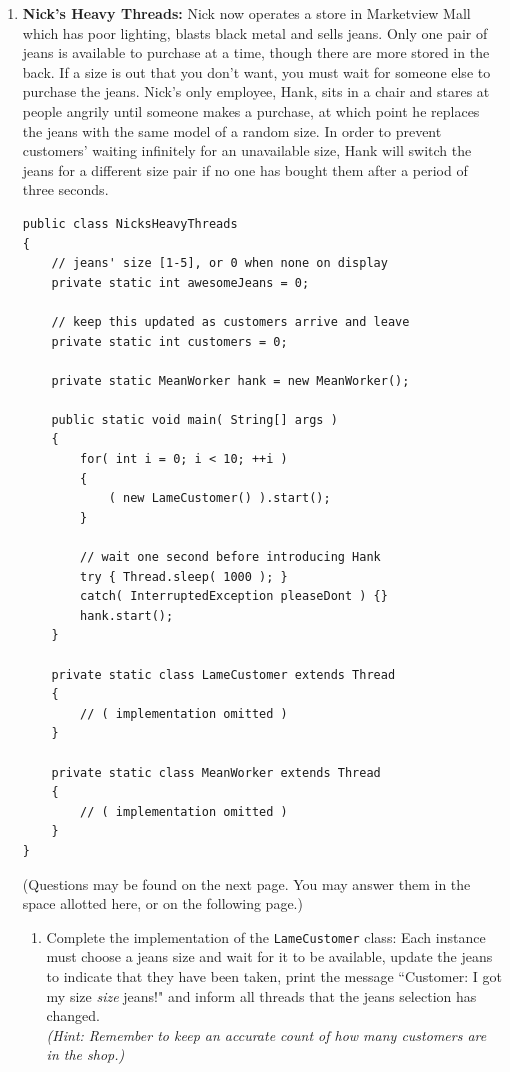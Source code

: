 \documentclass[11pt]{article}
\begin{document}
\begin{enumerate}

\item {\bf Nick's Heavy Threads:} Nick now operates a store in Marketview Mall which
      has poor lighting, blasts black metal and sells jeans. Only one pair of
      jeans is available to purchase at a time, though there are more
      stored in the back. If a size is out that you don't want, you must wait
      for someone else to purchase the jeans. Nick's only employee, Hank, sits
      in a chair and stares at people angrily until someone makes a purchase,
      at which point he replaces the jeans with the same model of a random
      size. In order to prevent customers' waiting infinitely for an
      unavailable size, Hank will switch the jeans for a different size pair if
      no one has bought them after a period of three seconds.

\begin{lstlisting}
public class NicksHeavyThreads
{
	// jeans' size [1-5], or 0 when none on display
    private static int awesomeJeans = 0;
    
	// keep this updated as customers arrive and leave
    private static int customers = 0;
    
    private static MeanWorker hank = new MeanWorker();
    
    public static void main( String[] args )
    {
        for( int i = 0; i < 10; ++i )
        {
            ( new LameCustomer() ).start();
        }

		// wait one second before introducing Hank
        try { Thread.sleep( 1000 ); }
        catch( InterruptedException pleaseDont ) {}
        hank.start();
    }
    
    private static class LameCustomer extends Thread
    {
        // ( implementation omitted )
    }
    
    private static class MeanWorker extends Thread
    {
        // ( implementation omitted )
    }
}
\end{lstlisting}
\scriptsize
(Questions may be found on the next page. You may answer them in the space allotted here, or on the following page.)
\normalsize

    \begin{enumerate}

	\pagebreak

    \item Complete the implementation of the \texttt{LameCustomer} class: Each instance
          must choose a jeans size and wait for it to be available, update the
          jeans to indicate that they have been taken, print the message
          ``Customer: I got my size \emph{size} jeans!" and inform all threads
          that the jeans selection has changed. \\
		  \textit{(Hint: Remember to keep an
          accurate count of how many customers are in the shop.)}


\end{enumerate}
\end{enumerate}
\end{document}
